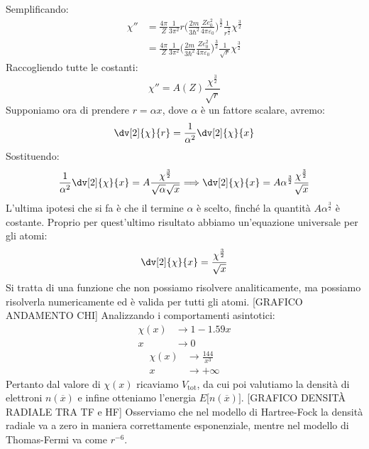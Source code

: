 Semplificando:
\begin{equation*}
    \begin{aligned}
    \chi''& =\frac{4\pi}{Z}\frac{1}{3\pi^2}r\bigg(\frac{2m}{3\hbar^2}\frac{Ze_0^2}{4\pi\varepsilon_0}\bigg)^{\frac32}\frac{1}{r^{\frac32}}\chi^{\frac32}\\
    & = \frac{4\pi}{Z}\frac{1}{3\pi^2}\bigg(\frac{2m}{3\hbar^2}\frac{Ze_0^2}{4\pi\varepsilon_0}\bigg)^{\frac32}\frac{1}{\sqrt r}\chi^{\frac32}
    \end{aligned}
\end{equation*}
Raccogliendo tutte le costanti:
\begin{equation*}
    \chi''=A(Z)\frac{\chi^{\frac32}}{\sqrt r}
\end{equation*}
Supponiamo ora di prendere $r=\alpha x$, dove $\alpha$ è un fattore scalare, avremo:
\begin{equation*}
    \dv[2]{\chi}{r}=\frac{1}{\alpha^2}\dv[2]{\chi}{x}
\end{equation*}
Sostituendo:
\begin{equation*}
    \frac{1}{\alpha^2}\dv[2]{\chi}{x}=A\frac{\chi^{\frac32}}{\sqrt \alpha \sqrt x}\Longrightarrow\dv[2]{\chi}{x}=A\alpha^{\frac 32}\frac{\chi^{\frac32}}{\sqrt x}
\end{equation*}
L'ultima ipotesi che si fa è che il termine $\alpha$ è scelto, finché la quantità $A\alpha^{\frac 32}$ è costante. Proprio per quest'ultimo risultato abbiamo un'equazione universale per gli atomi:
\begin{equation*}
    \dv[2]{\chi}{x}=\frac{\chi^{\frac 32}}{\sqrt x}
\end{equation*}
Si tratta di una funzione che non possiamo risolvere analiticamente, ma possiamo risolverla numericamente ed è valida per tutti gli atomi.
[GRAFICO ANDAMENTO CHI]
Analizzando i comportamenti asintotici:
\begin{equation*}
    \begin{aligned}
        \chi(x) &\rightarrow  1-1.59x\\
        x &\rightarrow 0
    \end{aligned}
\end{equation*}
\begin{equation*}
    \begin{aligned}
        \chi(x) &\rightarrow  \frac{144}{x^3}\\
        x &\rightarrow +\infty
    \end{aligned}
\end{equation*}
Pertanto dal valore di $\chi(x)$ ricaviamo $V_{\text{tot}}$, da cui poi valutiamo la densità di elettroni $n(\overline x)$ e infine otteniamo l'energia $E\big[n(\overline x)\big]$.
[GRAFICO DENSITÀ RADIALE TRA TF e HF]
Osserviamo che nel modello di Hartree-Fock la densità radiale va a zero in maniera correttamente esponenziale, mentre nel modello di Thomas-Fermi va come $r^{-6}$.
